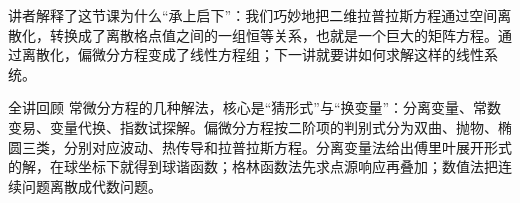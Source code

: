 \documentclass[a4paper]{article}
\begin{document}
讲者解释了这节课为什么“承上启下”：我们巧妙地把二维拉普拉斯方程通过空间离散化，转换成了离散格点值之间的一组恒等关系，也就是一个巨大的矩阵方程。通过离散化，偏微分方程变成了线性方程组；下一讲就要讲如何求解这样的线性系统。

\begin{knowledgebox}{全讲回顾}
常微分方程的几种解法，核心是“猜形式”与“换变量”：分离变量、常数变易、变量代换、指数试探解。偏微分方程按二阶项的判别式分为双曲、抛物、椭圆三类，分别对应波动、热传导和拉普拉斯方程。分离变量法给出傅里叶展开形式的解，在球坐标下就得到球谐函数；格林函数法先求点源响应再叠加；数值法把连续问题离散成代数问题。
\end{knowledgebox}
\end{document}
